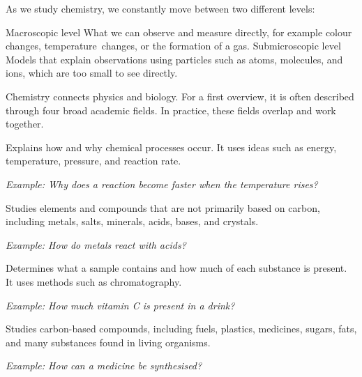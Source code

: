 As we study chemistry, we constantly move between two different levels:

\CompareBox
  {Macroscopic level}
  {What we can observe and measure directly, for example colour changes, temperature\ changes, or the formation of a gas.}
  {Submicroscopic level}
  {Models that explain observations using particles such as atoms, molecules, and ions, which are too small to see directly.}

\newpage
{}

Chemistry connects physics and biology. For a first overview, it is often described through four broad academic fields. In practice, these fields overlap and work together.


\par\smallskip

\begin{description}[
  style=nextline,
  font=\bfseries\color{DeepBlue},
  leftmargin=0pt,
  labelsep=0pt,
  itemsep=1ex,
  parsep=0pt
]

\item[Physical chemistry]
Explains how and why chemical processes occur. It uses
ideas such as energy, temperature, pressure, and
reaction rate.

\textit{Example: Why does a reaction become faster
when the temperature rises?}

\item[Inorganic chemistry]
Studies elements and compounds that are not primarily
based on carbon, including metals, salts, minerals,
acids, bases, and crystals.

\textit{Example: How do metals react with acids?}

\item[Analytical chemistry]
Determines what a sample contains and how much of each
substance is present. It uses methods such as
chromatography.

\textit{Example: How much vitamin C is present
in a drink?}

\item[Organic chemistry]
Studies carbon-based compounds, including fuels,
plastics, medicines, sugars, fats, and many substances
found in living organisms.

\textit{Example: How can a medicine be synthesised?}

\end{description}

\par\smallskip



